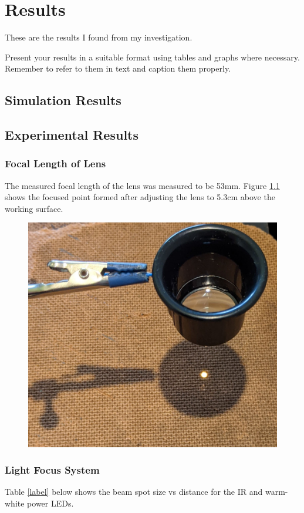 \chapter{Results}
\label{ch_results}

These are the results I found from my investigation.

Present your results in a suitable format using tables and graphs where necessary. Remember to refer
to them in text and caption them properly.


\section{Simulation Results}


\section{Experimental Results}

\subsection{Focal Length of Lens}

The measured focal length of the lens was measured to be 53mm. Figure \ref{fig:focal_length_experiemnt_result} shows the focused point formed after adjusting the lens to 5.3cm above the working surface.

\begin{figure}[H]
	\centering
	\includegraphics[width=.6\linewidth]{figures/results/focal_length_result.jpg}
	\label{fig:focal_length_experiemnt_result}
\end{figure}


\subsection{Light Focus System}

Table \ref{label} below shows the beam spot size vs distance for the IR and warm-white power LEDs.

